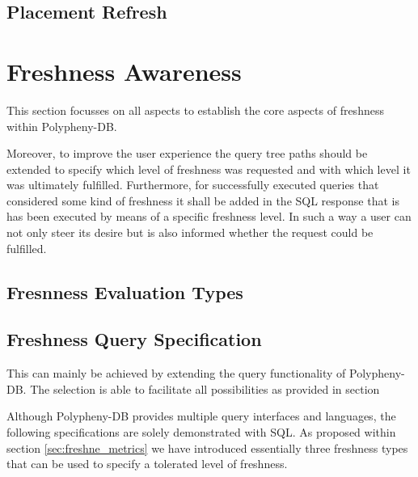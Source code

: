 


\subsection{Placement Refresh}






\section{Freshness Awareness}
This section focusses on all aspects to establish the core aspects of freshness within Polypheny-DB. 


Moreover, to improve the user experience the query tree paths should be extended to specify which level of freshness was requested and with which level it was 
ultimately fulfilled. Furthermore, for successfully executed queries that considered some kind of freshness it shall be added in the SQL response that is has been 
executed by means of a specific freshness level.
In such a way a user can not only steer its desire but is also informed whether the request could be fulfilled.


\subsection{Fresnness Evaluation Types}



\subsection{Freshness Query Specification}

This can mainly be achieved by extending the query functionality of Polypheny-DB.
The selection is able to facilitate all possibilities as provided in section 

Although Polypheny-DB provides multiple query interfaces and languages, the following specifications are solely demonstrated with SQL. 
As proposed within section \ref{sec:freshne_metrics} we have introduced essentially three freshness types that can be used to specify a tolerated level of freshness.

